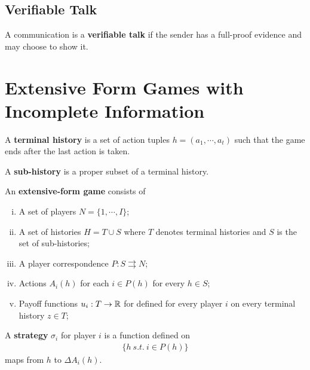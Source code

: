 \documentclass{article}
\begin{document}
   	
   	\subsection{Verifiable Talk}
   	\begin{definition}
   		A communication is a \textbf{verifiable talk} if the sender has a full-proof evidence and may choose to show it.
   	\end{definition}
   	
   	\section{Extensive Form Games with Incomplete Information}
   	\begin{definition}
   		A \textbf{terminal history} is a set of action tuples $h=(a_1, \cdots, a_t)$ such that the game ends after the last action is taken.
   	\end{definition}
   	
   	\begin{definition}
   		A \textbf{sub-history} is a proper subset of a terminal history.
   	\end{definition}
   	
   	\begin{definition}
   		An \textbf{extensive-form game} consists of
   		\begin{enumerate}[(i)]
   			\item A set of players $N = \{1, \cdots, I\}$;
   			\item A set of histories $H = T \cup S$ where $T$ denotes terminal histories and $S$ is the set of sub-histories;
   			\item A player correspondence $P: S \rightrightarrows N$;
   			\item Actions $A_i(h)$ for each $i \in P(h)$ for every $h \in S$;
   			\item Payoff functions $u_i:T \to \mathbb{R}$ for defined for every player $i$ on every terminal history $z \in T$;
   		\end{enumerate}
   	\end{definition}
   	
   	\begin{definition}
   		A \textbf{strategy} $\sigma_i$ for player $i$ is a function defined on 
   		\begin{align}
   			\{h\ s.t.\ i \in P(h)\}
   		\end{align}
   		maps from $h$ to $\Delta A_i(h)$.
   	\end{definition}
   	
\end{document}
